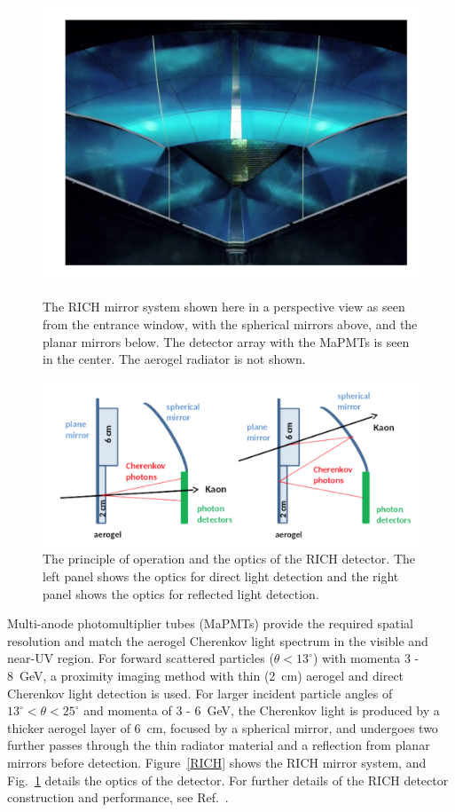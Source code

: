 \documentclass[final,3p,twocolumn]{elsarticle}
\begin{document}
\begin{figure}[t!]
\centerline{\includegraphics[width=1.0\columnwidth]{rich-mirrors.png}}
\caption{The RICH mirror system shown here in a perspective view as seen from the entrance window, with the
  spherical mirrors above, and the planar mirrors below. The detector array with the MaPMTs is seen in the center.
  The aerogel radiator is not shown.}
\label{RICH}
\includegraphics[width=1.0\columnwidth]{rich.png}
\caption{The principle of operation and the optics of the RICH detector. The left panel shows the optics for direct
  light detection and the right panel shows the optics for reflected light detection.}
\label{RICH-optics}
\end{figure}

Multi-anode photomultiplier tubes (MaPMTs) provide the required spatial resolution and match the aerogel
Cherenkov light spectrum in the visible and near-UV region. For forward scattered particles ($\theta < 13^\circ$)
with momenta 3 - 8~GeV, a proximity imaging method with thin (2~cm) aerogel and direct Cherenkov light detection
is used. For larger incident particle angles of $13^\circ < \theta < 25^\circ$ and momenta of 3 - 6~GeV, the Cherenkov
light is produced by a thicker aerogel layer of 6~cm, focused by a spherical mirror, and undergoes two further passes
through the thin radiator material and a reflection from planar mirrors before detection. Figure~\ref{RICH} shows
the RICH mirror system, and Fig.~\ref{RICH-optics} details the optics of the detector. For further details of the
RICH detector construction and performance, see Ref.~\cite{RICH}.
\end{document}
